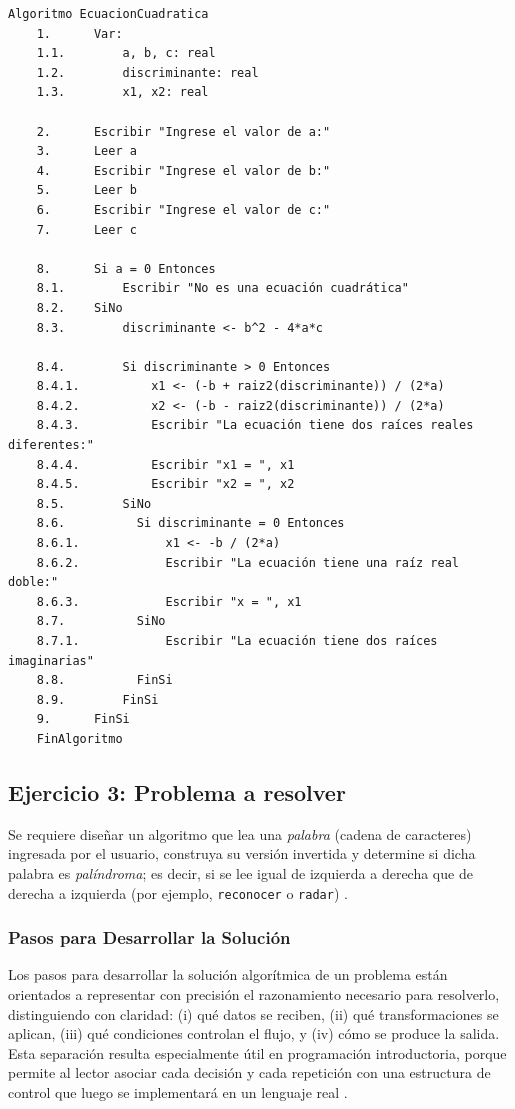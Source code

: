 \documentclass[12pt,twoside]{book}
\begin{document}
						\begin{lstlisting}[style=upsamStyle,caption={Determinación y cálculo de raíces de una ecuación cuadrática},label={alg:ecuacionCuadratica}]
	Algoritmo EcuacionCuadratica
	1.      Var:
	1.1.        a, b, c: real
	1.2.        discriminante: real
	1.3.        x1, x2: real
	
	2.      Escribir "Ingrese el valor de a:"
	3.      Leer a
	4.      Escribir "Ingrese el valor de b:"
	5.      Leer b
	6.      Escribir "Ingrese el valor de c:"
	7.      Leer c
	
	8.      Si a = 0 Entonces
	8.1.        Escribir "No es una ecuación cuadrática"
	8.2.    SiNo
	8.3.        discriminante <- b^2 - 4*a*c
	
	8.4.        Si discriminante > 0 Entonces
	8.4.1.          x1 <- (-b + raiz2(discriminante)) / (2*a)
	8.4.2.          x2 <- (-b - raiz2(discriminante)) / (2*a)
	8.4.3.          Escribir "La ecuación tiene dos raíces reales diferentes:"
	8.4.4.          Escribir "x1 = ", x1
	8.4.5.          Escribir "x2 = ", x2
	8.5.        SiNo
	8.6.          Si discriminante = 0 Entonces
	8.6.1.            x1 <- -b / (2*a)
	8.6.2.            Escribir "La ecuación tiene una raíz real doble:"
	8.6.3.            Escribir "x = ", x1
	8.7.          SiNo
	8.7.1.            Escribir "La ecuación tiene dos raíces imaginarias"
	8.8.          FinSi
	8.9.        FinSi
	9.      FinSi
	FinAlgoritmo \end{lstlisting}
					
				\subsection{Ejercicio 3: Problema a resolver}
					\noindent
					Se requiere diseñar un algoritmo que lea una \emph{palabra} (cadena de caracteres) ingresada por el usuario, construya su versión invertida y determine si dicha palabra es \emph{palíndroma}; es decir, si se lee igual de izquierda a derecha que de derecha a izquierda (por ejemplo, \texttt{reconocer} o \texttt{radar}) \cite{Joyanes2007Fundamentos,Gaddis2022Starting}.
					
					\subsubsection{Pasos para Desarrollar la Solución}
						\noindent
						Los pasos para desarrollar la solución algorítmica de un problema están orientados a representar con precisión el razonamiento necesario para resolverlo, distinguiendo con claridad: (i) qué datos se reciben, (ii) qué transformaciones se aplican, (iii) qué condiciones controlan el flujo, y (iv) cómo se produce la salida. Esta separación resulta especialmente útil en programación introductoria, porque permite al lector asociar cada decisión y cada repetición con una estructura de control que luego se implementará en un lenguaje real \cite{Farrell2018Programming,Gaddis2022Starting}.
						
\end{document}
